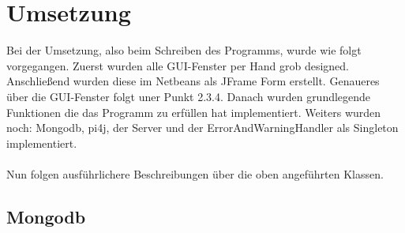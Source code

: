 \newpage

\section{Umsetzung}
Bei der Umsetzung, also beim Schreiben des Programms, wurde wie folgt vorgegangen. Zuerst wurden alle GUI-Fenster per Hand grob designed. Anschließend wurden diese im Netbeans als JFrame Form erstellt. Genaueres über die GUI-Fenster folgt uner Punkt 2.3.4. Danach wurden grundlegende Funktionen die das Programm zu erfüllen hat implementiert. Weiters wurden noch: Mongodb, pi4j, der Server und der ErrorAndWarningHandler als Singleton implementiert. 
\\ \\ 
Nun folgen ausführlichere Beschreibungen über die oben angeführten Klassen.

\subsection{Mongodb}
